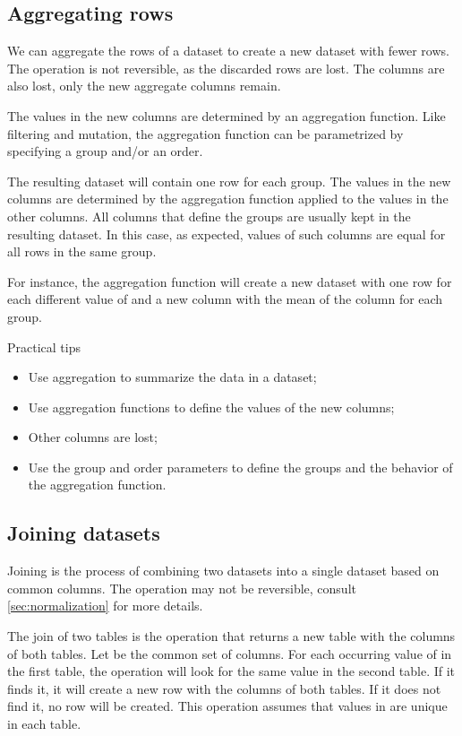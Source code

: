 \subsection{Aggregating rows}
\label{sub:aggregation}

We can aggregate the rows of a dataset to create a new dataset with fewer rows.    The
operation is not reversible, as the discarded rows are lost.  The columns are also lost,
only the new aggregate columns remain.

The values in the new columns are determined by an aggregation function.  Like filtering
and mutation, the aggregation function can be parametrized by specifying a group and/or an
order.

The resulting dataset will contain one row for each group.  The values in the new columns
are determined by the aggregation function applied to the values in the other columns.
All columns that define the groups are usually kept in the resulting dataset.  In this
case, as expected, values of such columns are equal for all rows in the same group.

For instance, the aggregation function  will create a
new dataset with one row for each different value of  and a new column
with the mean of the  column for each group.

\begin{hlbox}{Practical tips}
  \begin{itemize}
    \item Use aggregation to summarize the data in a dataset;
    \item Use aggregation functions to define the values of the new columns;
    \item Other columns are lost;
    \item Use the group and order parameters to define the groups and the behavior of the
      aggregation function.
  \end{itemize}
\end{hlbox}


\subsection{Joining datasets}

Joining is the process of combining two datasets into a single dataset based on common
columns.  The operation may not be reversible, consult \cref{sec:normalization} for more
details.

The join of two tables is the operation that returns a new table with the columns of both
tables.  Let  be the common set of columns.  For each occurring value of
 in the first table, the operation will look for the same value in the second
table.  If it finds it, it will create a new row with the columns of both tables.  If it
does not find it, no row will be created.  This operation assumes that values in 
are unique in each table.

